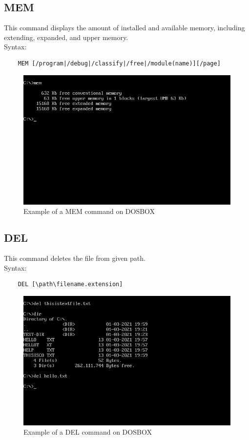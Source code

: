 \documentclass[17pt,a4paper,oneside,margin=1in]{article}
\begin{document}
\subsection{MEM}
This command displays the amount of installed and available memory, including extending, expanded, and upper memory.\\
Syntax: \\
\begin{verbatim}
	MEM [/program|/debug|/classify|/free|/module(name)][/page]
\end{verbatim}
\begin{figure}[h]
	\caption{Example of a MEM command on DOSBOX}
	\centering
	\includegraphics[width=1\textwidth]{./scrot/mem.png}
\end{figure}
\pagebreak


\subsection{DEL}
This command deletes the file from given path.\\
Syntax: \\
\begin{verbatim}
	DEL [\path\filename.extension]
\end{verbatim}
\begin{figure}[h]
	\caption{Example of a DEL command on DOSBOX}
	\centering
	\includegraphics[width=1\textwidth]{./scrot/del.png}
\end{figure}
\pagebreak
\end{document}
